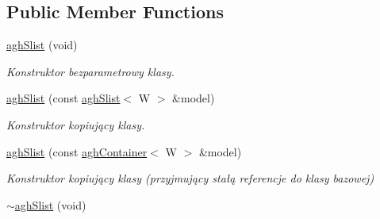 \subsection*{\-Public \-Member \-Functions}
\begin{DoxyCompactItemize}
\item 
\hypertarget{classaghSlist_a840c04c469deeee8a201cd0ea7b946d5}{\hyperlink{classaghSlist_a840c04c469deeee8a201cd0ea7b946d5}{agh\-Slist} (void)}\label{classaghSlist_a840c04c469deeee8a201cd0ea7b946d5}

\begin{DoxyCompactList}\small\item\em \-Konstruktor bezparametrowy klasy. \end{DoxyCompactList}\item 
\hyperlink{classaghSlist_a6a7c631322a874a66a931f6522700ec3}{agh\-Slist} (const \hyperlink{classaghSlist}{agh\-Slist}$<$ \-W $>$ \&model)
\begin{DoxyCompactList}\small\item\em \-Konstruktor kopiujący klasy. \end{DoxyCompactList}\item 
\hyperlink{classaghSlist_abc0bb36a38e765fb8fb8697c0a8bd6c8}{agh\-Slist} (const \hyperlink{classaghContainer}{agh\-Container}$<$ \-W $>$ \&model)
\begin{DoxyCompactList}\small\item\em \-Konstruktor kopiujący klasy (przyjmujący stałą referencje do klasy bazowej) \end{DoxyCompactList}\item 
\hypertarget{classaghSlist_a50e7f302972d1d1d8b480a094d3e1a6c}{\hyperlink{classaghSlist_a50e7f302972d1d1d8b480a094d3e1a6c}{$\sim$agh\-Slist} (void)}\label{classaghSlist_a50e7f302972d1d1d8b480a094d3e1a6c}


\end{DoxyCompactItemize}
